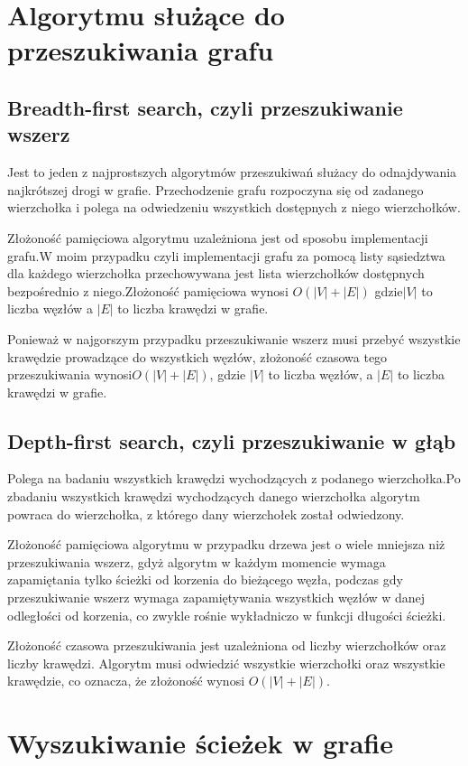 \documentclass[11pt]{article} %
\begin{document}
\section{Algorytmu służące do przeszukiwania grafu}
\subsection{Breadth-first search, czyli przeszukiwanie wszerz}
Jest to jeden z najprostszych algorytmów przeszukiwań służacy do odnajdywania najkrótszej drogi w grafie. Przechodzenie grafu rozpoczyna się od zadanego wierzchołka i polega na odwiedzeniu wszystkich dostępnych z niego wierzchołków.

Złożoność pamięciowa algorytmu uzależniona jest od sposobu implementacji grafu.W moim przypadku czyli implementacji grafu za pomocą listy sąsiedztwa dla każdego wierzchołka przechowywana jest lista wierzchołków dostępnych bezpośrednio z niego.Złożoność pamięciowa wynosi $O(|V|+|E|)$ gdzie$|V|$ to liczba węzłów a $|E|$ to liczba krawędzi w grafie.

Ponieważ w najgorszym przypadku przeszukiwanie wszerz musi przebyć wszystkie krawędzie prowadzące do wszystkich węzłów, złożoność czasowa tego przeszukiwania wynosi$ O(|V| + |E|)$, gdzie $|V|$ to liczba węzłów, a $|E|$ to liczba krawędzi w grafie.

\subsection{Depth-first search, czyli przeszukiwanie w głąb}
Polega na badaniu wszystkich krawędzi wychodzących z podanego wierzchołka.Po zbadaniu wszystkich krawędzi wychodzących danego wierzchołka algorytm powraca do wierzchołka, z którego dany wierzchołek został odwiedzony.

Złożoność pamięciowa algorytmu w przypadku drzewa jest o wiele mniejsza niż przeszukiwania wszerz, gdyż algorytm w każdym momencie wymaga zapamiętania tylko ścieżki od korzenia do bieżącego węzła, podczas gdy przeszukiwanie wszerz wymaga zapamiętywania wszystkich węzłów w danej odległości od korzenia, co zwykle rośnie wykładniczo w funkcji długości ścieżki.

Złożoność czasowa przeszukiwania jest uzależniona od liczby wierzchołków oraz liczby krawędzi. Algorytm musi odwiedzić wszystkie wierzchołki oraz wszystkie krawędzie, co oznacza, że złożoność wynosi $O(|V|+|E|)$.
\newpage
\section{Wyszukiwanie ścieżek w grafie}
\end{document}
